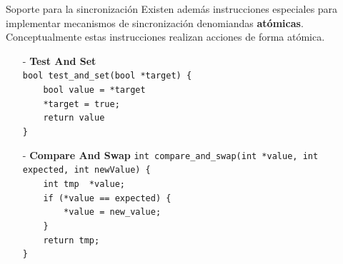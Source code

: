 \documentclass[aspectratio=169]{beamer}
\begin{document}
 
\begin{frame}[fragile]{Soporte para la sincronización}
    \small
    Existen además instrucciones especiales para implementar mecanismos de sincronización denomiandas \textbf{atómicas}.\\
    \medskip
    Conceptualmente estas instrucciones realizan acciones de forma atómica.
    \medskip
    \begin{itemize}
     \item[-] \textcolor{naranjauca}{\textbf{Test And Set}}\\
    \verb|bool test_and_set(bool *target) {|\\
    \verb|    bool value = *target         |\\
    \verb|    *target = true;              |\\
    \verb|    return value                 |\\
    \verb|}                                |\\
    \item[-] \textcolor{naranjauca}{\textbf{Compare And Swap}}
    \verb|int compare_and_swap(int *value, int expected, int newValue) {|\\
    \verb|    int tmp  *value;                                          |\\
    \verb|    if (*value == expected) {                                 |\\
    \verb|        *value = new_value;                                   |\\
    \verb|    }                                                         |\\
    \verb|    return tmp;                                               |\\
    \verb|}                                                             |\\
    \end{itemize}
\end{frame}
\end{document}
